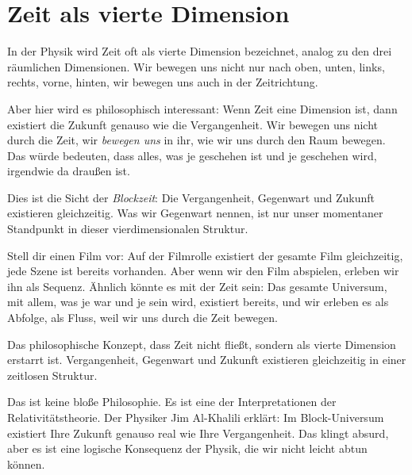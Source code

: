 \section{Zeit als vierte Dimension}

In der Physik wird Zeit oft als vierte Dimension bezeichnet, analog zu den drei räumlichen Dimensionen. Wir bewegen uns nicht nur nach oben, unten, links, rechts, vorne, hinten, wir bewegen uns auch in der Zeitrichtung.

Aber hier wird es philosophisch interessant: Wenn Zeit eine Dimension ist, dann existiert die Zukunft genauso wie die Vergangenheit. Wir bewegen uns nicht durch die Zeit, wir \emph{bewegen uns} in ihr, wie wir uns durch den Raum bewegen. Das würde bedeuten, dass alles, was je geschehen ist und je geschehen wird, irgendwie \glqq da draußen\grqq{} ist.

Dies ist die Sicht der \emph{Blockzeit}: Die Vergangenheit, Gegenwart und Zukunft existieren gleichzeitig. Was wir \glqq Gegenwart\grqq{} nennen, ist nur unser momentaner Standpunkt in dieser vierdimensionalen Struktur.

Stell dir einen Film vor: Auf der Filmrolle existiert der gesamte Film gleichzeitig, jede Szene ist bereits vorhanden. Aber wenn wir den Film abspielen, erleben wir ihn als Sequenz. Ähnlich könnte es mit der Zeit sein: Das gesamte Universum, mit allem, was je war und je sein wird, existiert bereits, und wir erleben es als Abfolge, als Fluss, weil wir uns durch die Zeit bewegen.

\begin{defi}[Blockzeit]
	Das philosophische Konzept, dass Zeit nicht \glqq fließt\grqq{}, sondern als vierte Dimension erstarrt ist. Vergangenheit, Gegenwart und Zukunft existieren gleichzeitig in einer zeitlosen Struktur.
\end{defi}

Das ist keine bloße Philosophie. Es ist eine der Interpretationen der Relativitätstheorie. Der Physiker Jim Al-Khalili erklärt: \glqq Im Block-Universum existiert Ihre Zukunft genauso real wie Ihre Vergangenheit.\grqq{} Das klingt absurd, aber es ist eine logische Konsequenz der Physik, die wir nicht leicht abtun können.

